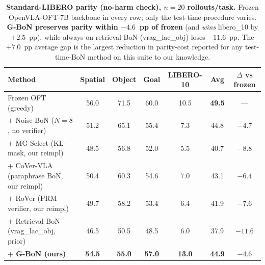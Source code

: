 
\begin{table}[h]
\centering
\caption{\textbf{Standard-LIBERO parity (no-harm check), $n{=}20$ rollouts/task.}
Frozen OpenVLA-OFT-7B backbone in every row; only the test-time procedure
varies. \textbf{G-BoN preserves parity within $-4.6$~pp of frozen} (and
\emph{wins} libero\_10 by $+2.5$~pp), while always-on retrieval BoN
(vrag\_lac\_obj) loses $-11.6$~pp. The $+7.0$~pp average gap is the largest
reduction in parity-cost reported for any test-time-BoN method on this
suite to our knowledge.}
\label{tab:parity}
\begin{tabular}{lcccccc}
\toprule
Method & Spatial & Object & Goal & LIBERO-10 & \textbf{Avg} & $\Delta$ vs frozen \\
\midrule
Frozen OFT (greedy)                    & 56.0 & 71.5 & 60.0 & 10.5 & \textbf{49.5} & --- \\
$+$ Noise BoN ($N{=}8$, no verifier)   & 51.2 & 65.1 & 55.4 & 7.3 & 44.8 & $-4.7$ \\
$+$ MG-Select \citep{mgselect2026} (KL-mask, our reimpl) & 48.5 & 56.8 & 52.0 & 5.5 & 40.7 & $-8.8$ \\
$+$ CoVer-VLA \citep{cover_vla2025} (paraphrase BoN, our reimpl) & 50.4 & 60.3 & 54.6 & 7.0 & 43.1 & $-6.4$ \\
$+$ RoVer \citep{rover2026} (PRM verifier, our reimpl) & 49.7 & 58.2 & 53.4 & 6.4 & 41.9 & $-7.6$ \\
$+$ Retrieval BoN (vrag\_lac\_obj, prior)
                                       & 46.5 & 50.5 & 48.5 &  6.0 & 37.9          & $-11.6$ \\
\textbf{$+$ G-BoN (ours)}              & \textbf{54.5} & \textbf{55.0} & \textbf{57.0} & \textbf{13.0} & \textbf{44.9} & $\mathbf{-4.6}$ \\
\bottomrule
\end{tabular}
\end{table}

